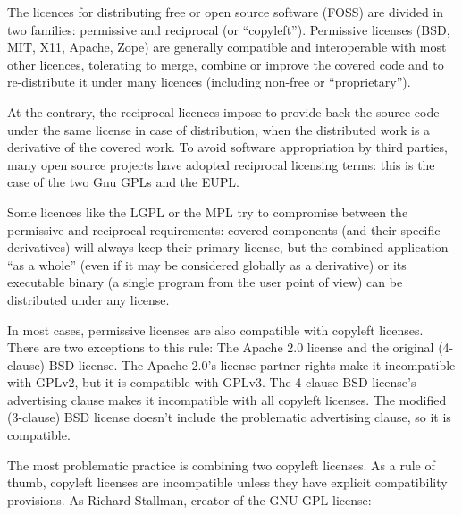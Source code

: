 \begin{flushleft}
	The licences for distributing free or open source software (FOSS) are divided
	in two families: permissive and reciprocal (or ``copyleft''). Permissive licenses
	(BSD, MIT, X11, Apache, Zope) are generally compatible and interoperable with most
	other licences, tolerating to merge, combine or improve the covered code and to
	re-distribute it under many licences (including non-free or ``proprietary'').
\end{flushleft}

\begin{flushleft}
	At the contrary, the reciprocal licences impose to provide back the source code
	under the same license in case of distribution, when the distributed work is
	a derivative of the covered work. To avoid software appropriation by third
	parties, many open source projects have adopted reciprocal licensing terms:
	this is the case of the two Gnu GPLs and the EUPL.
\end{flushleft}

\begin{flushleft}
	Some licences like the LGPL or the MPL try to compromise between the permissive
	and reciprocal requirements: covered components (and their specific derivatives)
	will always keep their primary license, but the combined application ``as a whole''
	(even if it may be considered globally as a derivative) or its executable binary
	(a single program from the user point of view) can be distributed under any license.
\end{flushleft}

\begin{flushleft}
	In most cases, permissive licenses are also compatible with copyleft licenses.
	There are two exceptions to this rule: The Apache 2.0 license and the original
	(4-clause) BSD license. The Apache 2.0's license partner rights make it incompatible
	with GPLv2, but it is compatible with GPLv3. The 4-clause BSD license's advertising
	clause makes it incompatible with all copyleft licenses. The modified (3-clause)
	BSD license doesn't include the problematic advertising clause, so it is compatible.
\end{flushleft}

\begin{flushleft}
	The most problematic practice is combining two copyleft licenses. As a rule of
	thumb, copyleft licenses are incompatible unless they have explicit compatibility
	provisions. As Richard Stallman, creator of the GNU GPL license:
\end{flushleft}

